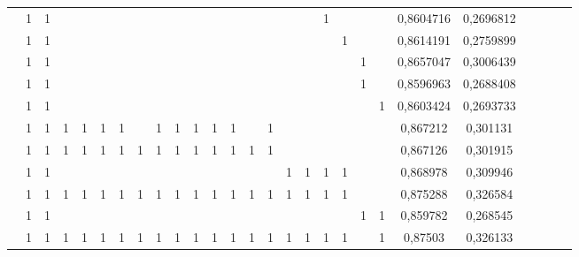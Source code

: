 \documentclass[noindent, nochapname]{tudexercise}
\begin{document}
\begin{table}
\begin{tabular}{ccccccccccccccccccccccccccc}
 & 1 & 1 &  &  &  &  &  &  &  &  &  &  &  &  &  &  & 1 &  &  &  & 0,8604716 & 0,2696812\\ 
 & 1 & 1 &  &  &  &  &  &  &  &  &  &  &  &  &  &  &  & 1 &  &  & 0,8614191 & 0,2759899\\ 
 & 1 & 1 &  &  &  &  &  &  &  &  &  &  &  &  &  &  &  &  & 1 &  & 0,8657047 & 0,3006439\\ 
 & 1 & 1 &  &  &  &  &  &  &  &  &  &  &  &  &  &  &  &  & 1 & & 0,8596963 & 0,2688408\\ 
 & 1 & 1 &  &  &  &  &  &  &  &  &  &  &  &  &  &  &  &  &  & 1 & 0,8603424 & 0,2693733\\ 
 & 1 & 1 & 1 & 1 & 1 & 1 &  & 1 & 1 & 1 & 1 & 1 &  & 1 &  &  &  &  &  &  & 0,867212 & 0,301131\\ 
 & 1 & 1 & 1 & 1 & 1 & 1 & 1 & 1 & 1 & 1 & 1 & 1 & 1 & 1 &  &  &  &  &  &  & 0,867126 & 0,301915\\ 
 & 1 & 1 &  &  &  &  &  &  &  &  &  &  &  &  & 1 & 1 & 1 & 1 &  &  & 0,868978 & 0,309946\\ 
 & 1 & 1 & 1 & 1 & 1 & 1 & 1 & 1 & 1 & 1 & 1 & 1 & 1 & 1 & 1 & 1 & 1 & 1 &  &  & 0,875288 & 0,326584\\ 
 & 1 & 1 &  &  &  &  &  &  &  &  &  &  &  &  &  &  &  &  & 1 & 1 & 0,859782 & 0,268545\\ 
 & 1 & 1 & 1 & 1 & 1 & 1 & 1 & 1 & 1 & 1 & 1 & 1 & 1 & 1 & 1 & 1 & 1 & 1 &  & 1 & 0,87503 & 0,326133\\ \bottomrule
\end{tabular}
\label{tab:results}
\end{table}
\end{document}
